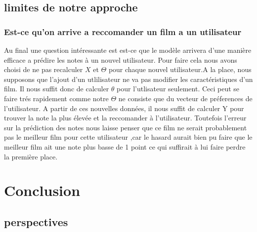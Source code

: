 \documentclass[a4paper,10pt]{article}
\begin{document}
\subsection{limites de notre approche}
\subsubsection{Est-ce qu'on arrive a reccomander un film a un utilisateur}
Au final une question intéressante est est-ce que le modèle arrivera d'une manière efficace a prédire les notes à un nouvel utilisateur. Pour faire cela nous avons
choisi de ne pas recalculer $X$ et $\Theta$ pour chaque nouvel utilisateur.A la place, nous supposons que l'ajout d'un utlilisateur ne va pas modifier
les caractéristiques d'un film. Il nous suffit donc de calculer $\theta$ pour l'utlisateur seulement. Ceci peut se faire trés rapidement comme notre $\Theta$ ne
consiste que du vecteur de préferences de l'utilisateur. A partir de ces nouvelles données, il nous suffit de calculer Y pour trouver la note la plus élevée et la reccomander
à l'utilisateur. Toutefois l'erreur sur la prédiction des notes nous laisse penser que ce film ne serait probablement pas le meilleur film
pour cette utilisateur ,car le hasard aurait bien pu faire que le meilleur film ait une note plus basse de 1 point ce qui suffirait à lui faire perdre la première place.
\section{Conclusion}

\subsection{perspectives}
\end{document}
